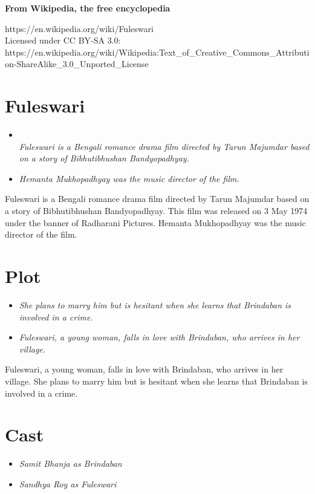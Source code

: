 \textbf{From Wikipedia, the free encyclopedia}

https://en.wikipedia.org/wiki/Fuleswari\\
Licensed under CC BY-SA 3.0:\\
https://en.wikipedia.org/wiki/Wikipedia:Text\_of\_Creative\_Commons\_Attribution-ShareAlike\_3.0\_Unported\_License

\section{Fuleswari}\label{fuleswari}

\begin{itemize}
\item
  \emph{\\[4\baselineskip]Fuleswari is a Bengali romance drama film
  directed by Tarun Majumdar based on a story of Bibhutibhushan
  Bandyopadhyay.}
\item
  \emph{Hemanta Mukhopadhyay was the music director of the film.}
\end{itemize}

Fuleswari is a Bengali romance drama film directed by Tarun Majumdar
based on a story of Bibhutibhushan Bandyopadhyay. This film was released
on 3 May 1974 under the banner of Radharani Pictures. Hemanta
Mukhopadhyay was the music director of the film.

\section{Plot}\label{plot}

\begin{itemize}
\item
  \emph{She plans to marry him but is hesitant when she learns that
  Brindaban is involved in a crime.}
\item
  \emph{Fuleswari, a young woman, falls in love with Brindaban, who
  arrives in her village.}
\end{itemize}

Fuleswari, a young woman, falls in love with Brindaban, who arrives in
her village. She plans to marry him but is hesitant when she learns that
Brindaban is involved in a crime.

\section{Cast}\label{cast}

\begin{itemize}
\item
  \emph{Samit Bhanja as Brindaban}
\item
  \emph{Sandhya Roy as Fuleswari}
\end{itemize}

